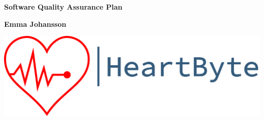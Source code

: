 \begin{titlepage}
   \begin{center}
		\vspace*{1cm}
		\Huge
		\textbf{Software Quality Assurance Plan}
		
		\Large
		\vspace{1.5cm}
		\textbf{Emma Johansson}
		    
		\vspace{0.5cm}
		
		           
		\vfill
\includegraphics[width=\linewidth]{Pictures/logo_heartbyte_transparent_v_1_1 (1)}

    \vfill
            
   \end{center}
\end{titlepage}
